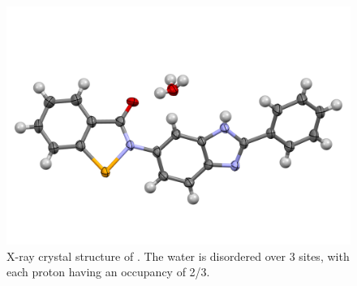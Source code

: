 \begin{refsection}
\begin{figure}[ht]
    \centering
    \includegraphics[width=0.8\linewidth]{Figures/ebs-rhs-xray.pdf}
    \caption[X-ray crystal structure of .]{X-ray crystal structure of . The water is disordered over 3 sites, with each proton having an occupancy of 2/3.}\label{fig:ebs-rhs-xray}
\end{figure}

\end{refsection}
